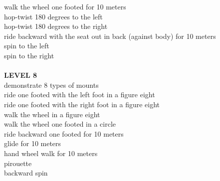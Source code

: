 \begin{multicols}{2}
walk the wheel one footed for 10 meters\\
hop-twist 180 degrees to the left\\
hop-twist 180 degrees to the right\\
ride backward with the seat out in back (against body) for 10 meters\\
spin to the left\\
spin to the right\\\\
\textbf{LEVEL 8}\\
demonstrate 8 types of mounts\\
ride one footed with the left foot in a figure eight\\
ride one footed with the right foot in a figure eight\\
walk the wheel in a figure eight\\
walk the wheel one footed in a circle\\
ride backward one footed for 10 meters\\
glide for 10 meters\\
hand wheel walk for 10 meters\\
pirouette\\
backward spin\\
\columnbreak


\end{multicols}
